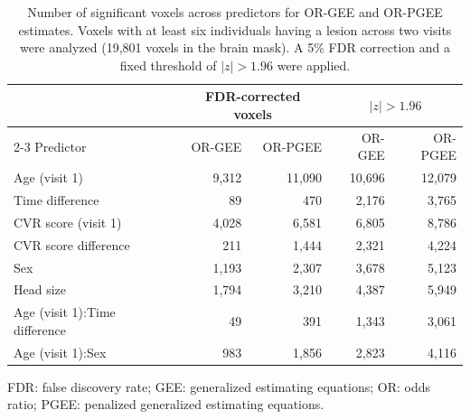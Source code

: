 \begin{table}[htbp]
\centering
\caption{Number of significant voxels across predictors for OR-GEE and OR-PGEE estimates. Voxels with at least six individuals having a lesion across two visits were analyzed (19,801 voxels in the brain mask). A 5\% FDR correction and a fixed threshold of $|z| > 1.96$ were applied.}
\label{tab:or-significant-voxels}
\setlength{\tabcolsep}{7pt}
\renewcommand{\arraystretch}{1.15}
\begin{tabular}{lrrrr}
\hline
& \multicolumn{2}{c}{FDR-corrected voxels} & \multicolumn{2}{c}{$|z| > 1.96$} \\
\cline{2-3}\cline{4-5}
Predictor & OR-GEE & OR-PGEE & OR-GEE & OR-PGEE \\ 
\hline
Age (visit 1) & 9,312 & 11,090 & 10,696 & 12,079 \\
Time difference & 89 & 470 & 2,176 & 3,765 \\
CVR score (visit 1) & 4,028 & 6,581 & 6,805 & 8,786 \\
CVR score difference & 211 & 1,444 & 2,321 & 4,224 \\
Sex & 1,193 & 2,307 & 3,678 & 5,123 \\
Head size & 1,794 & 3,210 & 4,387 & 5,949 \\
Age (visit 1):Time difference & 49 & 391 & 1,343 & 3,061 \\
Age (visit 1):Sex & 983 & 1,856 & 2,823 & 4,116 \\
\hline
\end{tabular}

\vspace{0.4em}
\begin{minipage}{0.94\linewidth}
\footnotesize
FDR: false discovery rate; GEE: generalized estimating equations; OR: odds ratio; PGEE: penalized generalized estimating equations.
\end{minipage}
\end{table}
